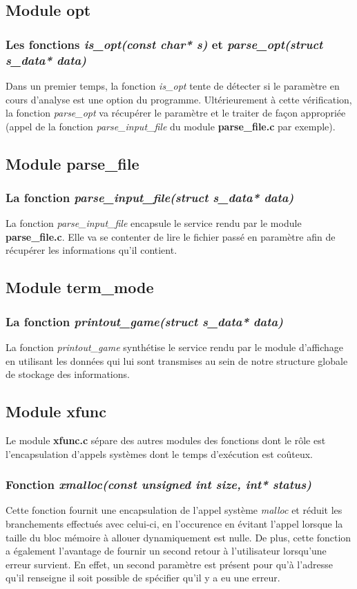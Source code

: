 \documentclass{report}
\begin{document}
\subsection{Module opt}
\subsubsection*{Les fonctions \textit{is\_opt(const char* s)} et \textit{parse\_opt(struct s\_data* data)}}
Dans un premier temps, la fonction \textit{is\_opt} tente de détecter si le paramètre en cours d'analyse est une option du programme.
Ultérieurement à cette vérification, la fonction \textit{parse\_opt} va récupérer le paramètre et le traiter de façon appropriée (appel de la fonction \textit{parse\_input\_file} du module \textbf{parse\_file.c} par exemple).

\subsection{Module parse\_file}
\subsubsection*{La fonction \textit{parse\_input\_file(struct s\_data* data)}}
La fonction \textit{parse\_input\_file} encapsule le service rendu par le module \textbf{parse\_file.c}.
Elle va se contenter de lire le fichier passé en paramètre afin de récupérer les informations qu'il contient.

\subsection{Module term\_mode}
\subsubsection*{La fonction \textit{printout\_game(struct s\_data* data)}}
La fonction \textit{printout\_game} synthétise le service rendu par le module d'affichage en utilisant les données qui lui sont transmises au sein de notre structure globale de stockage des informations.

\subsection{Module xfunc}
Le module \textbf{xfunc.c} sépare des autres modules des fonctions dont le rôle est l'encapsulation d'appels systèmes dont le temps d'exécution est coûteux.
\subsubsection*{Fonction \textit{xmalloc(const unsigned int size, int* status)}}
Cette fonction fournit une encapsulation de l'appel système \textit{malloc} et réduit les branchements effectués avec celui-ci, en l'occurence en évitant l'appel lorsque la taille du bloc mémoire à allouer dynamiquement est nulle.
De plus, cette fonction a également l'avantage de fournir un second retour à l'utilisateur lorsqu'une erreur survient. En effet, un second paramètre est présent pour qu'à l'adresse qu'il renseigne il soit possible de spécifier qu'il y a eu une erreur.
\end{document}
